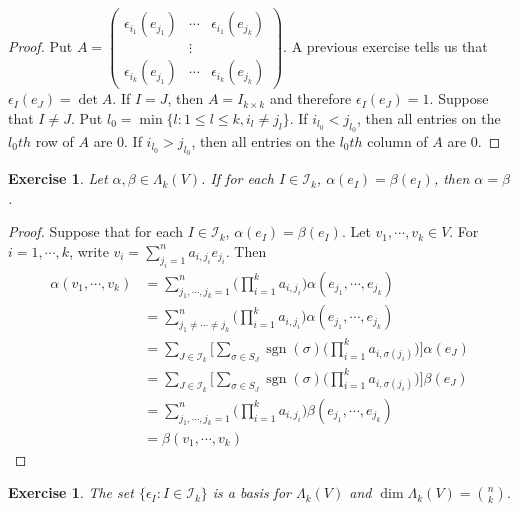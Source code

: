 \documentclass[12pt]{amsart}
\newtheorem{ex}[thm]{Exercise}
\newcommand{\al}{\alpha}
\newcommand{\bet}{\beta}
\newcommand{\Lam}{\Lambda}
\newcommand{\ep}{\epsilon}
\newcommand{\sig}{\sigma}
\newcommand{\MI}{\mathcal{I}}
\DeclareMathOperator{\sgn}{sgn}
\begin{document}
	\begin{proof}
		Put $A = \begin{pmatrix}
			\ep_{i_1}(e_{j_1}) & \cdots & \ep_{i_1}(e_{j_k}) \\
			& \vdots & \\
			\ep_{i_k}(e_{j_1}) & \cdots & \ep_{i_k}(e_{j_k}) 
		\end{pmatrix}$.
		A previous exercise tells us that $\ep_I(e_J) = \det A$.
		If $I = J$, then $A = I_{k\times k}$ and therefore $\ep_I(e_J) = 1$. Suppose that $I \neq J$. Put $l_0 = \min \{l: 1 \leq l \leq k, i_l \neq j_l\}$. If $i_{l_0} < j_{l_0}$, then all entries on the $l_0th$ row of $A$ are $0$. If $i_{l_0} > j_{l_0}$, then all entries on the $l_0th$ column of $A$ are $0$.
	\end{proof}

	\begin{ex}
		Let $\al , \bet \in \Lam_k(V)$. If for each $I \in \MI_k$, $\al(e_I) = \bet(e_I)$, then $\al = \bet$.
	\end{ex}

	\begin{proof}
		Suppose that for each $I \in \MI_k$, $\al(e_I) = \bet(e_I)$. Let $v_1, \cdots, v_k \in V$. For $i = 1, \cdots, k$, write $v_i = \sum_{j_i = 1}^n a_{i,j_i}e_{j_i}$. Then 
		\begin{align*}
			\al(v_1, \cdots, v_k) 
			&= \sum_{j_1, \cdots, j_k =1}^n \bigg( \prod_{i=1}^k a_{i, j_i} \bigg) \al(e_{j_1}, \cdots, e_{j_k}) \\
			&= \sum_{j_1 \neq \cdots \neq j_k}^n \bigg( \prod_{i=1}^k a_{i, j_i} \bigg) \al(e_{j_1}, \cdots, e_{j_k}) \\
			&= \sum_{J \in \MI_k} \bigg [ \sum_{\sig \in S_J} \sgn(\sig) \bigg( \prod_{i=1}^k a_{i, \sig(j_i)} \bigg) \bigg] \al(e_J) \\
			&= \sum_{J \in \MI_k} \bigg [ \sum_{\sig \in S_J} \sgn(\sig) \bigg( \prod_{i=1}^k a_{i, \sig(j_i)} \bigg) \bigg] \bet(e_J) \\
			&= \sum_{j_1, \cdots, j_k =1}^n \bigg( \prod_{i=1}^k a_{i, j_i} \bigg) \bet(e_{j_1}, \cdots, e_{j_k}) \\
			&= \bet(v_1, \cdots, v_k) 
		\end{align*}
	
	\end{proof}

	\begin{ex}
		The set $\{\ep_I: I \in \MI_k\}$ is a basis for $\Lam_k(V)$ and $\dim \Lam_k(V) = {n \choose k}$.
	\end{ex}
\end{document}
